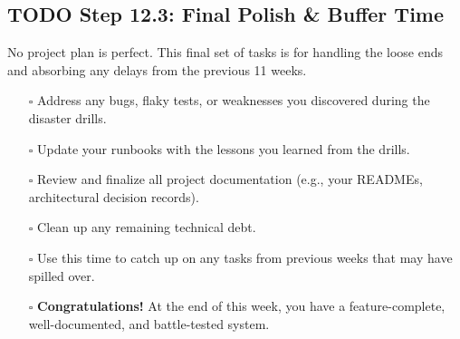 \documentclass[11pt]{article}
\begin{document}
\subsection{{\bfseries\sffamily TODO} Step 12.3: Final Polish \& Buffer Time}
\label{sec:org0f89819}
No project plan is perfect. This final set of tasks is for handling the loose ends and absorbing any delays from the previous 11 weeks.

\begin{itemize}
\item[{$\square$}] Address any bugs, flaky tests, or weaknesses you discovered during the disaster drills.
\item[{$\square$}] Update your runbooks with the lessons you learned from the drills.
\item[{$\square$}] Review and finalize all project documentation (e.g., your READMEs, architectural decision records).
\item[{$\square$}] Clean up any remaining technical debt.
\item[{$\square$}] Use this time to catch up on any tasks from previous weeks that may have spilled over.
\item[{$\square$}] \textbf{Congratulations!} At the end of this week, you have a feature-complete, well-documented, and battle-tested system.
\end{itemize}
\end{document}
